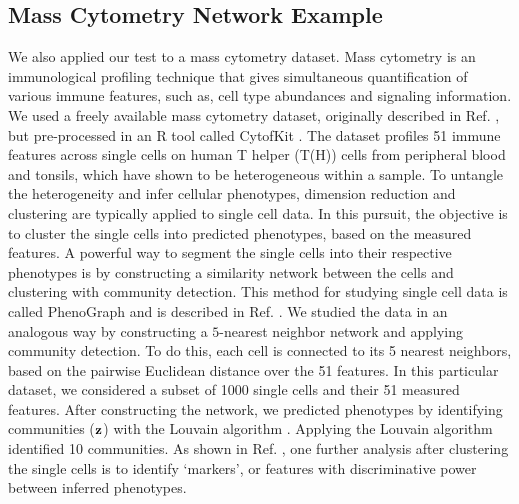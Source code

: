 \subsection{Mass Cytometry Network Example}
We also applied our test to a mass cytometry dataset. Mass cytometry \cite{cytof} is an immunological profiling technique that gives simultaneous quantification of various immune features, such as, cell type abundances and signaling information. We used a freely available mass cytometry dataset, originally described in Ref. \cite{wong2015}, but pre-processed in an R tool called CytofKit \cite{cytofkit}. The dataset profiles 51 immune features across single cells on human T helper (T(H)) cells from peripheral blood and tonsils, which have shown to be heterogeneous within a sample. To untangle the heterogeneity and infer cellular phenotypes, dimension reduction and clustering are typically applied to single cell data. In this pursuit, the objective is to cluster the single cells into predicted phenotypes, based on the measured features. A powerful way to segment the single cells into their respective phenotypes is by constructing a similarity network between the cells and clustering with community detection. This method for studying single cell data is called PhenoGraph and is described in Ref. \cite{phenoGraph}. We studied the data in an analogous way by constructing a $5$-nearest neighbor network and applying community detection. To do this, each cell is connected to its 5 nearest neighbors, based on the pairwise Euclidean distance over the 51 features. In this particular dataset, we considered a subset of 1000 single cells and their 51 measured features. After constructing the network, we predicted phenotypes by identifying communities (${\bf z}$) with the Louvain algorithm \cite{blondel}. Applying the Louvain algorithm identified 10 communities.  As shown in Ref. \cite{cytofkit}, one further analysis after clustering the single cells is to identify `markers', or features with discriminative power between inferred phenotypes. 

